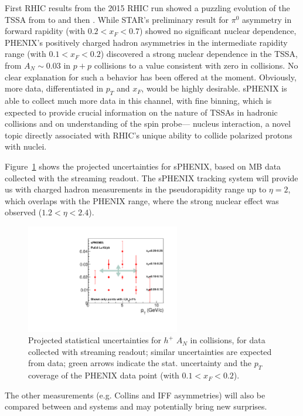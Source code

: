 First RHIC results from the 2015 RHIC run showed a puzzling evolution
of the TSSA from \pp to \pAl and then \pAu. While STAR's
preliminary result for $\pi^{0}$ asymmetry in forward rapidity (with
$0.2<x_F<0.7$) showed no significant nuclear dependence, PHENIX's
positively charged hadron asymmetries in the intermediate rapidity
range (with $0.1<x_F<0.2$) discovered a strong nuclear dependence in
the TSSA, from $A_N \sim 0.03$ in $p+p$ collisions to a value
consistent with zero in \pAu collisions. No clear explanation for
such a behavior has been offered at the moment. Obviously, more data,
differentiated in $p_T$ and $x_F$, would be highly desirable. sPHENIX
is able to collect much more data in this channel, with fine binning,
which is expected to provide crucial information on the nature of
TSSAs in hadronic collisions and on understanding of the spin probe---
nucleus interaction, a novel topic directly associated with RHIC's
unique ability to collide polarized protons with nuclei. 

Figure~\ref{fig:AN_h} shows the projected uncertainties for sPHENIX,
based on MB data collected with the streaming readout. The sPHENIX
tracking system will provide us with charged hadron measurements in
the pseudorapidity range up to $\eta=2$, which overlaps with the
PHENIX range, where the strong nuclear effect was observed
($1.2<\eta<2.4$). 

\begin{figure}[htbp]
\centering
\includegraphics[width=0.60\textwidth]{figs/sphenix_han.pdf}
\caption{Projected statistical uncertainties for $h^{+}$ $A_N$ in
  \pp collisions, for data collected with streaming readout; similar
  uncertainties are expected from \pAu data; green arrows indicate
  the stat. uncertainty and the $p_T$ coverage of the PHENIX data
  point (with $0.1<x_F<0.2$).} 
\label{fig:AN_h}
\end{figure}

The other measurements (e.g. Collins and IFF asymmetries) will also be
compared between \pp and \pA systems and may potentially bring new
surprises. 


